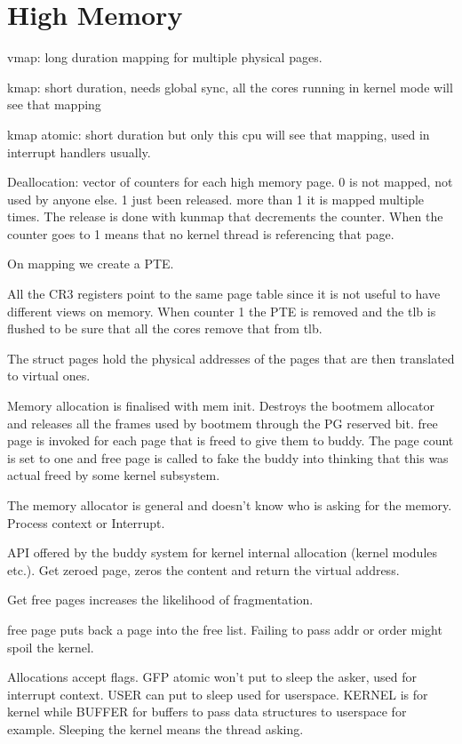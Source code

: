 \documentclass[twoside]{article}
\begin{document}
\section{High Memory}

vmap: long duration mapping for multiple physical pages.

kmap: short duration, needs global sync, all the cores running in kernel mode will see that mapping

kmap atomic: short duration but only this cpu will see that mapping, used in interrupt handlers usually. 

Deallocation: vector of counters for each high memory page. 0 is not mapped, not used by anyone else. 1 just been released. more than 1 it is mapped multiple times. The release is done with kunmap that decrements the counter. When the counter goes to 1 means that no kernel thread is referencing that page.

On mapping we create a PTE.

All the CR3 registers point to the same page table since it is not useful to have different views on memory. When counter 1 the PTE is removed and the tlb is flushed to be sure that all the cores remove that from tlb. 

The struct pages hold the physical addresses of the pages that are then translated to virtual ones.

Memory allocation is finalised with mem init. Destroys the bootmem allocator and releases all the frames used by bootmem through the PG reserved bit. free page is invoked for each page that is freed to give them to buddy. The page count is set to one and free page is called to fake the buddy into thinking that this was actual freed by some kernel subsystem.

The memory allocator is general and doesn't know who is asking for the memory. Process context or Interrupt.

API offered by the buddy system for kernel internal allocation (kernel modules etc.). Get zeroed page, zeros the content and return the virtual address.

Get free pages increases the likelihood of fragmentation.

free page puts back a page into the free list. Failing to pass addr or order might spoil the kernel.


Allocations accept flags. GFP atomic won't put to sleep the asker, used for interrupt context. USER can put to sleep used for userspace. KERNEL is for kernel while BUFFER for buffers to pass data structures to userspace for example. Sleeping the kernel means the thread asking.
\end{document}
